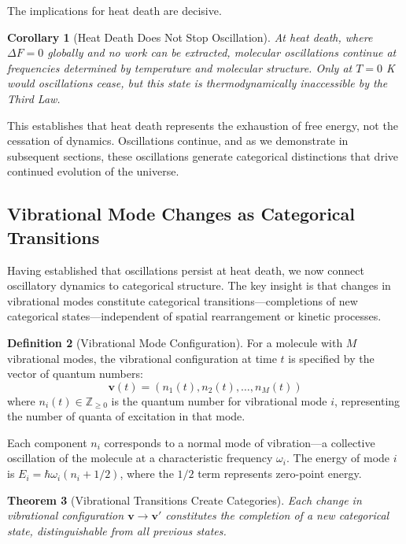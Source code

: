 \documentclass[12pt,a4paper]{article}
\newtheorem{theorem}{Theorem}[section]
\newtheorem{corollary}[theorem]{Corollary}
\theoremstyle{definition}
\newtheorem{definition}[theorem]{Definition}
\theoremstyle{remark}
\begin{document}
The implications for heat death are decisive.

\begin{corollary}[Heat Death Does Not Stop Oscillation]
\label{cor:heat_death_oscillation}
At heat death, where $\Delta F = 0$ globally and no work can be extracted, molecular oscillations continue at frequencies determined by temperature and molecular structure. Only at $T = 0$ K would oscillations cease, but this state is thermodynamically inaccessible by the Third Law.
\end{corollary}

This establishes that heat death represents the exhaustion of free energy, not the cessation of dynamics. Oscillations continue, and as we demonstrate in subsequent sections, these oscillations generate categorical distinctions that drive continued evolution of the universe.

\subsection{Vibrational Mode Changes as Categorical Transitions}

Having established that oscillations persist at heat death, we now connect oscillatory dynamics to categorical structure. The key insight is that changes in vibrational modes constitute categorical transitions—completions of new categorical states—independent of spatial rearrangement or kinetic processes.

\begin{definition}[Vibrational Mode Configuration]
\label{def:vibrational_config}
For a molecule with $M$ vibrational modes, the vibrational configuration at time $t$ is specified by the vector of quantum numbers:
\begin{equation}
\mathbf{v}(t) = (n_1(t), n_2(t), \ldots, n_M(t))
\end{equation}
where $n_i(t) \in \mathbb{Z}_{\geq 0}$ is the quantum number for vibrational mode $i$, representing the number of quanta of excitation in that mode.
\end{definition}

Each component $n_i$ corresponds to a normal mode of vibration—a collective oscillation of the molecule at a characteristic frequency $\omega_i$. The energy of mode $i$ is $E_i = \hbar\omega_i(n_i + 1/2)$, where the $1/2$ term represents zero-point energy.

\begin{theorem}[Vibrational Transitions Create Categories]
\label{thm:vibrational_categories}
Each change in vibrational configuration $\mathbf{v} \to \mathbf{v}'$ constitutes the completion of a new categorical state, distinguishable from all previous states.
\end{theorem}
\end{document}
